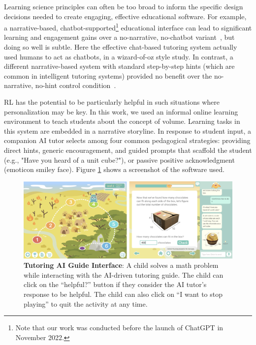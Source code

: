 \documentclass[sn-mathphys,Numbered]{sn-jnl}%
\theoremstyle{thmstyleone}%
\theoremstyle{thmstyletwo}%
\theoremstyle{thmstylethree}%
\begin{document}
Learning science principles can often be too broad to inform the specific design decisions needed to create engaging, effective educational software. For example, a 
narrative-based, chatbot-supported\footnote{Note that our work was conducted before the launch of ChatGPT in November 2022.} educational interface can lead to significant learning and engagement gains over a no-narrative, no-chatbot variant~\cite{woz}, but doing so well is subtle. Here the effective chat-based tutoring system actually used humans to act as chatbots, in a wizard-of-oz style study. In contrast, a different  narrative-based system with standard step-by-step hints (which are common in intelligent tutoring systems) 
provided no benefit over the no-narrative, no-hint control condition~\cite{woz}. 

RL has the potential to be particularly helpful in such situations where personalization may be key. In this work, we used an informal online learning environment to teach students about the concept of volume. Learning tasks in this system are embedded in a narrative storyline. In response to student input, a companion AI tutor selects among four common pedagogical strategies: providing direct hints, generic encouragement, and guided prompts that scaffold the student (e.g., "Have you heard of a unit cube?"), or passive positive acknowledgment (emoticon smiley face).  Figure \ref{rlbot:fig:chatbot_interface} shows a screenshot of the software used. 
\begin{figure}[!th]%
    \centering
    \includegraphics[width=\linewidth]{Figures/Interface.pdf} 
    \caption{\textbf{Tutoring AI Guide Interface}: A child solves a math problem while interacting with the AI-driven tutoring guide. The child can click on the “helpful?” button if they consider the AI tutor’s response to be helpful. The child can also click on “I want to stop playing” to quit the activity at any time.}
    \label{rlbot:fig:chatbot_interface}
\end{figure}
\end{document}
